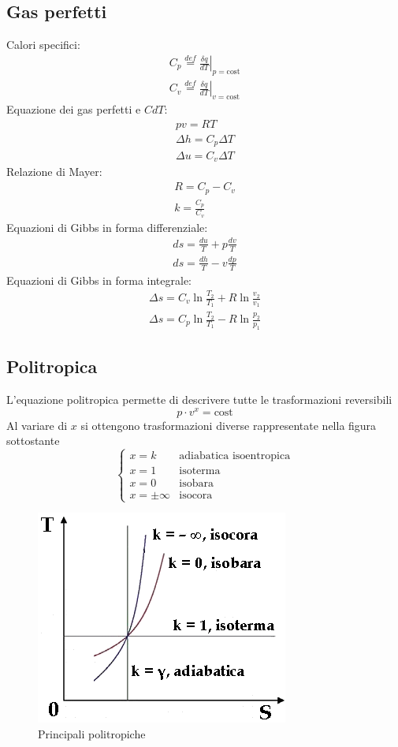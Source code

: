 \documentclass[a4paper,10pt]{article}
\begin{document}
\subsection{Gas perfetti}
Calori specifici:
\begin{gather}
 C_p \stackrel{def}{=} \left.\frac{\delta q}{dT}\right|_{p=\text{cost}}\\
 C_v \stackrel{def}{=} \left.\frac{\delta q}{dT}\right|_{v=\text{cost}}
\end{gather}
Equazione dei gas perfetti e \(CdT\):
\begin{gather}
pv=RT\\
\Delta h=C_p\Delta T\\
\Delta u=C_v\Delta T
\end{gather}
Relazione di Mayer:
\begin{gather}
 R = C_p - C_v\\
 k = \frac{C_p}{C_v}
\end{gather}
Equazioni di Gibbs in forma differenziale:
\begin{gather}
 ds = \frac{du}{T} + p\frac{dv}{T}\\
 ds = \frac{dh}{T} - v\frac{dp}{T}
\end{gather}
Equazioni di Gibbs in forma integrale:
\begin{gather}
 \Delta s = C_v \ln{\frac{T_2}{T_1}} + R \ln{\frac{v_2}{v_1}} \\
 \Delta s = C_p \ln{\frac{T_2}{T_1}} - R \ln{\frac{p_2}{p_1}}
\end{gather}
\subsection{Politropica}
\label{subsec:politropica}
L'equazione politropica permette di descrivere tutte le trasformazioni reversibili
\begin{equation}
\label{eq:politropica}
 p\cdot v^x=\text{cost}
\end{equation}
Al variare di \(x\) si ottengono trasformazioni diverse rappresentate nella figura 
sottostante
\[\begin{cases}
 x=k & \text{adiabatica isoentropica}\\
 x=1 & \text{isoterma}\\
 x=0 & \text{isobara}\\
 x=\pm\infty & \text{isocora}
\end{cases}\]
\begin{figure}[H]
\label{fig:politropiche}
 \centering
 \includegraphics[width=0.5\linewidth]{media/politropiche.png}
 \caption{Principali politropiche}
\end{figure}
\end{document}
